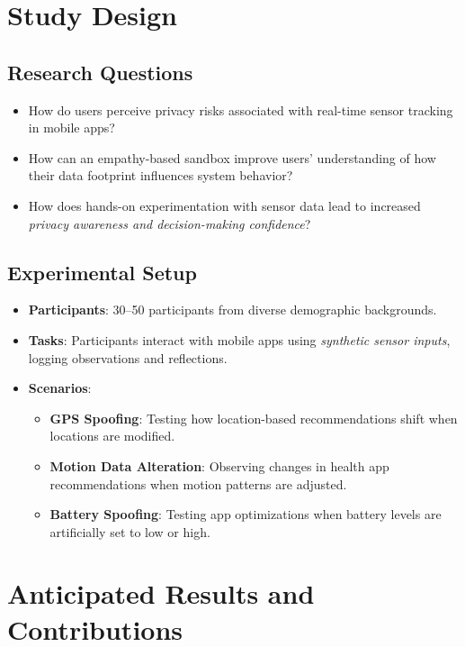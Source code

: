 \documentclass[acmlarge, nonacm]{acmart}
\begin{document}
\section{Study Design}

\subsection{Research Questions}
\begin{itemize}
    \item How do users perceive privacy risks associated with real-time sensor tracking in mobile apps?
    \item How can an empathy-based sandbox improve users’ understanding of how their data footprint influences system behavior?
    \item How does hands-on experimentation with sensor data lead to increased \textit{privacy awareness and decision-making confidence}?
\end{itemize}

\subsection{Experimental Setup}
\begin{itemize}
    \item \textbf{Participants}: 30--50 participants from diverse demographic backgrounds.
    \item \textbf{Tasks}: Participants interact with mobile apps using \textit{synthetic sensor inputs}, logging observations and reflections.
    \item \textbf{Scenarios}:
        \begin{itemize}
            \item \textbf{GPS Spoofing}: Testing how location-based recommendations shift when locations are modified.
            \item \textbf{Motion Data Alteration}: Observing changes in health app recommendations when motion patterns are adjusted.
            \item \textbf{Battery Spoofing}: Testing app optimizations when battery levels are artificially set to low or high.
        \end{itemize}
\end{itemize}

\section{Anticipated Results and Contributions}
\end{document}
